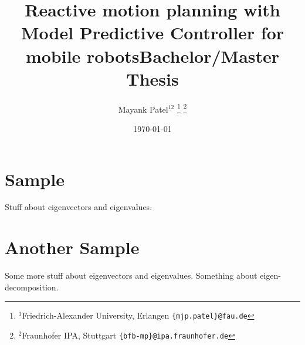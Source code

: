 \documentclass[english,paper=a5,headsepline=true,9pt,DIV=12,BCOR=0.7cm]{scrbook}
\title{Reactive motion planning with Model Predictive Controller for mobile robots}
\author{Mayank Patel$^{12}$%
\thanks{$^{1}$Friedrich-Alexander University, Erlangen
	{\tt\small \{mjp.patel\}@fau.de}}
\thanks{$^{2}$Fraunhofer IPA, Stuttgart
	{\tt\small \{bfb-mp\}@ipa.fraunhofer.de}}
}
\title{Bachelor/Master Thesis} %
\author{\authorstring}
\date{\today} %
\theoremstyle{definition}
\numberwithin{equation}{section}	%
\numberwithin{figure}{section}		%
\numberwithin{table}{section}	%
\begin{document}
 
\maketitle
\chapter{Sample} 

Stuff about eigenvectors and 
eigenvalues. 

\chapter{Another Sample} 

Some more stuff about eigenvectors and 
eigenvalues. Something about 
eigen-decomposition. 
\end{document}
